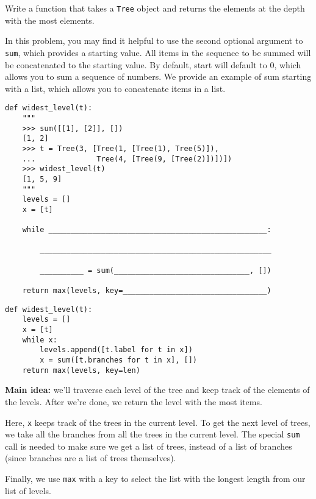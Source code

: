 \question
Write a function that takes a \texttt{Tree} object and returns the
elements at the depth with the most elements.

In this problem, you may find it helpful to use the second optional argument to
\texttt{sum}, which provides a starting value. All items in the sequence to be
summed will be concatenated to the starting value. By default, start will
default to 0, which allows you to sum a sequence of numbers. We provide an
example of sum starting with a list, which allows you to concatenate items in a
list.

\begin{lstlisting}
def widest_level(t):
    """
    >>> sum([[1], [2]], [])
    [1, 2]
    >>> t = Tree(3, [Tree(1, [Tree(1), Tree(5)]),
    ...              Tree(4, [Tree(9, [Tree(2)])])])
    >>> widest_level(t)
    [1, 5, 9]
    """
    levels = []
    x = [t]

    while __________________________________________________:

        _____________________________________________________

        __________ = sum(_______________________________, [])

    return max(levels, key=_________________________________)
\end{lstlisting}

\begin{solution}
\begin{lstlisting}
def widest_level(t):
    levels = []
    x = [t]
    while x:
        levels.append([t.label for t in x])
        x = sum([t.branches for t in x], [])
    return max(levels, key=len)
\end{lstlisting}
\textbf{Main idea:} we'll traverse each level of the tree and keep track of the
elements of the levels. After we're done, we return the level with the most
items.

Here, \texttt{x} keeps track of the trees in the current level. To get the next
level of trees, we take all the branches from all the trees in the current
level. The special \texttt{sum} call is needed to make sure we get a list of
trees, instead of a list of branches (since branches are a list of trees
themselves).

Finally, we use \texttt{max} with a key to select the list with the longest
length from our list of levels.
\end{solution}
